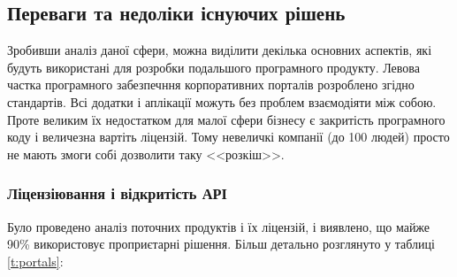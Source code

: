 \subsection{Переваги та недоліки існуючих рішень}
Зробивши аналіз даної сфери, можна виділити декілька основних аспектів, які будуть використані для розробки подальшого програмного продукту.
Левова частка програмного забезпечння корпоративних порталів розроблено згідно стандартів\cite{portlet_2}. 
Всі додатки і аплікації можуть без проблем взаємодіяти між собою. 
Проте великим їх недостатком для малої сфери бізнесу є закритість програмного коду і величезна вартіть ліцензій.
Тому невеличкі компанії (до 100 людей) просто не мають змоги собі дозволити таку <<розкіш>>.

\subsubsection{Ліцензіювання і відкритість АРІ}
\par Було проведено аналіз поточних продуктів і їх ліцензій, і виявлено, що майже 90\% використовує проприєтарні рішення.
Більш детально розглянуто у таблиці \ref{t:portals}:

